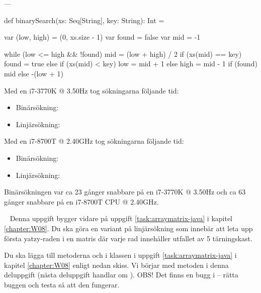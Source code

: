 \SOLUTION


\TaskSolved \what


\SubtaskSolved ---

\SubtaskSolved
\begin{Code}
def binarySearch(xs: Seq[String], key: String): Int = {

  var (low, high) = (0, xs.size - 1)
  var found = false
  var mid = -1

  while (low <= high && !found) {
    mid = (low + high) / 2
    if (xs(mid) == key) found = true
    else if (xs(mid) < key) low = mid + 1
    else high = mid - 1
  }
  if (found)
    mid
  else
    -(low + 1)
}
\end{Code}

\SubtaskSolved
Med en i7-3770K @ 3.50Hz tog sökningarna följande tid:

\begin{itemize}
\item Binärsökning: 
\item Linjärsökning: 
\end{itemize}

Med en i7-8700T @ 2.40GHz tog sökningarna följande tid:
\begin{itemize}
\item Binärsökning: 
\item Linjärsökning: 
\end{itemize}




\SubtaskSolved
Binärsökningen var ca 23 gånger snabbare på en i7-3770K @ 3.50Hz och ca 63 gånger snabbare på en i7-8700T CPU @ 2.40GHz.



\QUESTEND







\QUESTBEGIN

\Task  \what~  Denna uppgift bygger vidare på uppgift \ref{task:arraymatrix-java} i kapitel \ref{chapter:W08}. Du ska göra en variant på linjärsökning som innebär att leta upp första yatzy-raden i en matris där varje rad innehåller utfallet av 5 tärningskast.

\Subtask Du ska lägga till metoderna  och  i klassen  i uppgift \ref{task:arraymatrix-java} i kapitel \ref{chapter:W08} enligt nedan skiss. Vi börjar med metoden   i denna deluppgift (nästa deluppgift handlar om ). OBS! Det finns en bugg i  -- rätta buggen och testa så att den fungerar.

